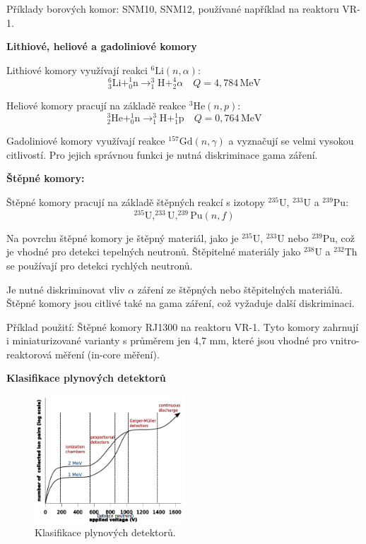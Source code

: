 Příklady borových komor: SNM10, SNM12, používané například na reaktoru VR-1.

\textbf{Lithiové, heliové a gadoliniové komory}

Lithiové komory využívají reakci $^6\text{Li}(n, \alpha)$:
\[
^6_3\text{Li} + ^1_0\text{n} \rightarrow ^3_1\text{H} + ^4_2\alpha \quad Q = 4{,}784\,\text{MeV}
\]

Heliové komory pracují na základě reakce $^3\text{He}(n, p)$:
\[
^3_2\text{He} + ^1_0\text{n} \rightarrow ^3_1\text{H} + ^1_1\text{p} \quad Q = 0{,}764\,\text{MeV}
\]

Gadoliniové komory využívají reakce $^{157}\text{Gd}(n, \gamma)$ a vyznačují se velmi vysokou citlivostí. Pro jejich správnou funkci je nutná diskriminace gama záření.

\textbf{Štěpné komory:}

Štěpné komory pracují na základě štěpných reakcí s izotopy $^{235}\text{U}$, $^{233}\text{U}$ a $^{239}\text{Pu}$:
\[
^{235}\text{U}, ^{233}\text{U}, ^{239}\text{Pu} (n, f)
\]

Na povrchu štěpné komory je štěpný materiál, jako je $^{235}\text{U}$, $^{233}\text{U}$ nebo $^{239}\text{Pu}$, což je vhodné pro detekci tepelných neutronů. Štěpitelné materiály jako $^{238}\text{U}$ a $^{232}\text{Th}$ se používají pro detekci rychlých neutronů.

Je nutné diskriminovat vliv $\alpha$ záření ze štěpných nebo štěpitelných materiálů. Štěpné komory jsou citlivé také na gama záření, což vyžaduje další diskriminaci.

Příklad použití: Štěpné komory RJ1300 na reaktoru VR-1. Tyto komory zahrnují i miniaturizované varianty s průměrem jen 4,7 mm, které jsou vhodné pro vnitro-reaktorová měření (in-core měření).

\textbf{Klasifikace plynových detektorů}

\begin{figure}[H] 
    \centering
    \includegraphics[width=0.5\textwidth]{img/KlasifikacePlynovýchDetektorů.png}
    \caption{Klasifikace plynových detektorů.}
    \label{fig:KlasifikacePlynovýchDetektorů}
\end{figure}


